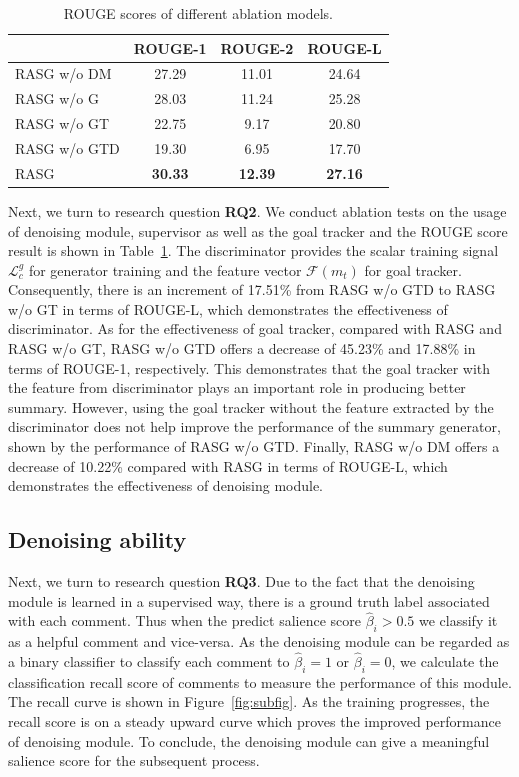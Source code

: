 \documentclass[letterpaper]{article}
\begin{document}
\begin{table}[t]
\centering
\small
\caption{ROUGE scores of different ablation models.}
\begin{adjustbox}{width=0.29\columnwidth}
\begin{tabular}{@{}lcc c@{}}
\toprule
& ROUGE-1 & ROUGE-2 & ROUGE-L \\
\midrule
RASG w/o DM & 27.29 & 11.01 & 24.64 \\
RASG w/o G & 28.03 & 11.24 & 25.28 \\
RASG w/o GT & 22.75 & 9.17 & 20.80 \\
RASG w/o GTD & 19.30 & 6.95 & 17.70 \\
RASG & \textbf{30.33} & \textbf{12.39} & \textbf{27.16} \\
\bottomrule
\end{tabular}
\end{adjustbox}
\label{tab:comp_rouge_ablation}
\end{table}
Next, we turn to research question \textbf{RQ2}.
We conduct ablation tests on the usage of denoising module, supervisor as well as the goal tracker and the ROUGE score result is shown in Table~\ref{tab:comp_rouge_ablation}.
The discriminator provides the scalar training signal $\mathcal{L}_c^g$ for generator training and the feature vector $\mathcal{F}(m_t)$ for goal tracker.
Consequently, there is an increment of 17.51\% from RASG w/o GTD to RASG w/o GT in terms of ROUGE-L, which demonstrates the effectiveness of discriminator.
As for the effectiveness of goal tracker, compared with RASG and RASG w/o GT, RASG w/o GTD offers a decrease of 45.23\% and 17.88\% in terms of ROUGE-1, respectively. This demonstrates that the goal tracker with the feature from discriminator plays an important role in producing better summary.
However, using the goal tracker without the feature extracted by the discriminator does not help improve the performance of the summary generator, shown by the performance of RASG w/o GTD.
Finally, RASG w/o DM offers a decrease of 10.22\% compared with RASG in terms of ROUGE-L, which demonstrates the effectiveness of denoising module.

\subsection{Denoising ability}

Next, we turn to research question \textbf{RQ3}.
Due to the fact that the denoising module is learned in a supervised way, there is a ground truth label associated with each comment.
Thus when the predict salience score $\hat{\beta}_i > 0.5$ we classify it as a helpful comment and vice-versa.
As the denoising module can be regarded as a binary classifier to classify each comment to $\hat{\beta}_i = 1$ or $\hat{\beta}_i = 0$, we calculate the classification recall score of comments to measure the performance of this module.
The recall curve is shown in Figure~\ref{fig:subfig}.
As the training progresses, the recall score is on a steady upward curve which proves the improved performance of denoising module.
To conclude, the denoising module can give a meaningful salience score for the subsequent process.
\end{document}
